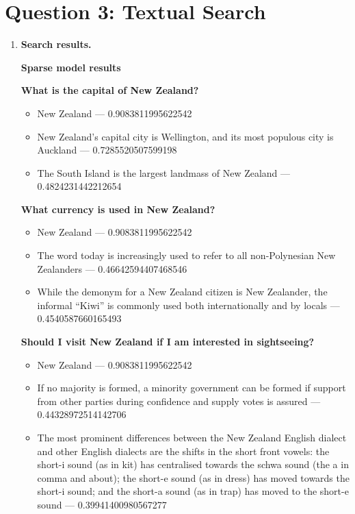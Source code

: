 \documentclass[11pt]{article}
\begin{document}
\newpage
\section*{Question 3: Textual Search}

\begin{enumerate}[leftmargin=1.6em,itemsep=6pt]
  \item \textbf{Search results.}

  \textbf{Sparse model results}

  \textbf{What is the capital of New Zealand?}
  \begin{itemize}
    \item New Zealand --- 0.9083811995622542
    \item New Zealand's capital city is Wellington, and its most populous city is Auckland ---
    0.7285520507599198
    \item The South Island is the largest landmass of New Zealand --- 0.4824231442212654
  \end{itemize}

  \textbf{What currency is used in New Zealand?}
  \begin{itemize}
    \item New Zealand --- 0.9083811995622542
    \item The word today is increasingly used to refer to all non-Polynesian New Zealanders ---
    0.46642594407468546
    \item While the demonym for a New Zealand citizen is New Zealander, the informal ``Kiwi''
    is commonly used both internationally and by locals --- 0.4540587660165493
  \end{itemize}

  \textbf{Should I visit New Zealand if I am interested in sightseeing?}
  \begin{itemize}
    \item New Zealand --- 0.9083811995622542
    \item If no majority is formed, a minority government can be formed if support from other
    parties during confidence and supply votes is assured --- 0.44328972514142706
    \item The most prominent differences between the New Zealand English dialect and other
    English dialects are the shifts in the short front vowels: the short-i sound (as in kit)
    has centralised towards the schwa sound (the a in comma and about); the short-e sound
    (as in dress) has moved towards the short-i sound; and the short-a sound (as in trap) has
    moved to the short-e sound --- 0.39941400980567277
  \end{itemize}


\end{enumerate}
\end{document}
